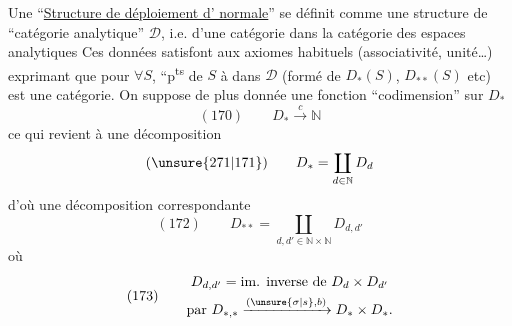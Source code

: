 Une ``\uline{Structure de déploiement d' normale}'' se définit  comme une structure de ``catégorie  analytique'' $\mathcal D$, i.e. d'une catégorie dans la catégorie des espaces analytiques
 Ces données satisfont aux axiomes habituels (associativité, unité\ldots) exprimant que
pour $\forall S$,   ``p\textsuperscript{ts} de $S$ à  dans $\mathcal D$ (formé de $D_*(S)$, $D_{**}(S)$ etc) est une catégorie. On suppose de plus donnée une fonction ``codimension'' sur $D_*$
\[
(170)\qquad D_*\xrightarrow{c}\mathbb N
\]
ce qui revient à une décomposition
\[
(\unsure{271|171})\qquad D_*=\coprod_{d\in\mathbb N}D_d
\]
d'où une décomposition correspondante
\[
(172)\qquad D_{**}=\coprod_{d,d'\in\mathbb N\times\mathbb N}D_{d,d'}
\]
où
\[
(173)\qquad\begin{gathered}
D_{d,d'}=\text{im. inverse de }D_d\times D_{d'}\\
\text{par }D_{*,*}\xrightarrow{(\unsure{\sigma|s},b)}D_*\times D_*.
\end{gathered}
\]

